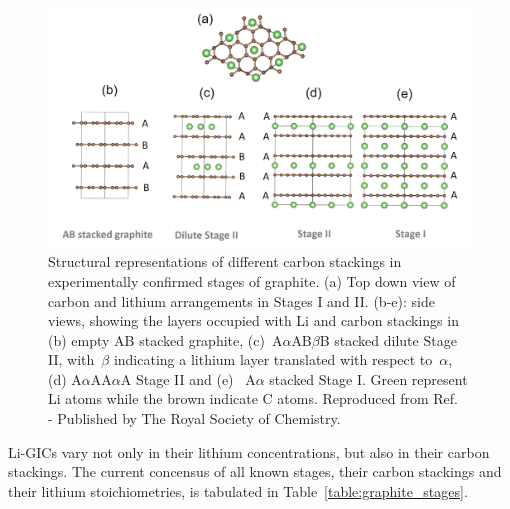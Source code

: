 \documentclass[../main.tex]{subfiles}
\begin{document}
\begin{figure}[h!]
    \begin{center}
    \includegraphics[width=0.98\columnwidth]{figures/stages_version4.png}
    \caption{Structural representations of different carbon stackings in experimentally confirmed stages of graphite. (a) Top down view of carbon and lithium arrangements in Stages I and II. (b-e): side views, showing
    the layers occupied with Li and carbon stackings in (b) empty AB stacked graphite, (c)~A\(\alpha\)AB\(\beta\)B stacked dilute Stage II, with~\(\beta\) indicating a lithium layer translated with respect to~\(\alpha\), (d)
    A\(\alpha\)AA\(\alpha\)A Stage II and (e)~ A\(\alpha\) stacked Stage I. Green represent Li atoms while
    the brown indicate C atoms. Reproduced from Ref.~ - Published by The Royal Society of Chemistry.}
    \label{fig:graphite_stages_schematics}
    \end{center}
\end{figure}

Li-GICs vary not only in their lithium concentrations, but also in their carbon stackings. The current concensus of all known stages, their carbon stackings and their lithium stoichiometries, is tabulated in Table~\ref{table:graphite_stages}.
\end{document}
